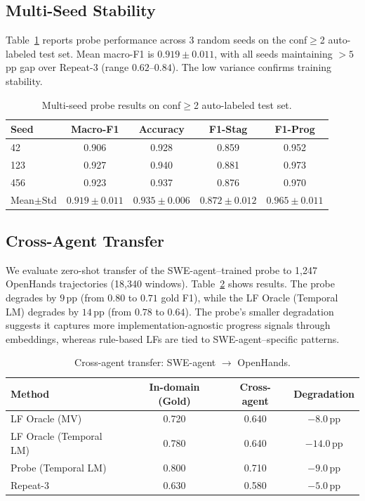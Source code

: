 \documentclass[11pt]{article}
\begin{document}
\subsection{Multi-Seed Stability}
\label{sec:stability}

Table~\ref{tab:multiseed} reports probe performance across 3 random seeds on the conf$\geq$2 auto-labeled test set.
Mean macro-F1 is $0.919 \pm 0.011$, with all seeds maintaining $>5$\,pp gap over Repeat-3 (range $0.62$--$0.84$).
The low variance confirms training stability.

\begin{table}[t]
\centering
\caption{Multi-seed probe results on conf$\geq$2 auto-labeled test set.}
\label{tab:multiseed}
\small
\begin{tabular}{lcccc}
\toprule
Seed & Macro-F1 & Accuracy & F1-Stag & F1-Prog \\
\midrule
42 & 0.906 & 0.928 & 0.859 & 0.952 \\
123 & 0.927 & 0.940 & 0.881 & 0.973 \\
456 & 0.923 & 0.937 & 0.876 & 0.970 \\
\midrule
Mean$\pm$Std & $0.919{\pm}0.011$ & $0.935{\pm}0.006$ & $0.872{\pm}0.012$ & $0.965{\pm}0.011$ \\
\bottomrule
\end{tabular}
\end{table}

\subsection{Cross-Agent Transfer}
\label{sec:transfer}

We evaluate zero-shot transfer of the SWE-agent--trained probe to 1,247 OpenHands trajectories (18,340 windows).
Table~\ref{tab:cross_agent} shows results.
The probe degrades by $9$\,pp (from $0.80$ to $0.71$ gold F1), while the LF Oracle (Temporal LM) degrades by $14$\,pp (from $0.78$ to $0.64$).
The probe's smaller degradation suggests it captures more implementation-agnostic progress signals through embeddings, whereas rule-based LFs are tied to SWE-agent--specific patterns.

\begin{table}[t]
\centering
\caption{Cross-agent transfer: SWE-agent $\rightarrow$ OpenHands.}
\label{tab:cross_agent}
\small
\begin{tabular}{lccc}
\toprule
Method & In-domain (Gold) & Cross-agent & Degradation \\
\midrule
LF Oracle (MV) & 0.720 & 0.640 & $-8.0$\,pp \\
LF Oracle (Temporal LM) & 0.780 & 0.640 & $-14.0$\,pp \\
Probe (Temporal LM) & 0.800 & 0.710 & $-9.0$\,pp \\
Repeat-3 & 0.630 & 0.580 & $-5.0$\,pp \\
\bottomrule
\end{tabular}
\end{table}
\end{document}
